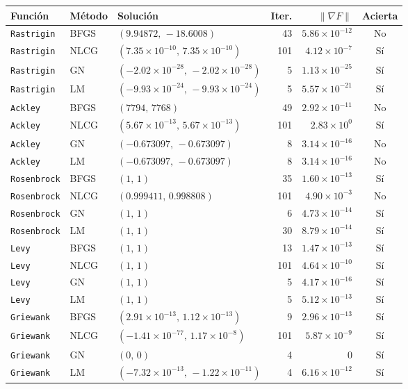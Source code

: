 \begin{tabular}{l l l r r c}
\toprule
\rowcolor{Azul1!50}
Función & Método & Solución & Iter. & $\|\nabla F\|$ & Acierta \\
\midrule
\texttt{Rastrigin} & BFGS & $(9.94872,\,-18.6008)$ & 43 & $5.86\times10^{-12}$ & No \\
\texttt{Rastrigin} & NLCG & $(7.35\times10^{-10},\,7.35\times10^{-10})$ & 101 & $4.12\times10^{-7}$ & Sí \\
\texttt{Rastrigin} & GN & $(-2.02\times10^{-28},\,-2.02\times10^{-28})$ & 5 & $1.13\times10^{-25}$ & Sí \\
\texttt{Rastrigin} & LM & $(-9.93\times10^{-24},\,-9.93\times10^{-24})$ & 5 & $5.57\times10^{-21}$ & Sí \\
\texttt{Ackley} & BFGS & $(7794,\,7768)$ & 49 & $2.92\times10^{-11}$ & No \\
\texttt{Ackley} & NLCG & $(5.67\times10^{-13},\,5.67\times10^{-13})$ & 101 & $2.83\times10^{0}$ & Sí \\
\texttt{Ackley} & GN & $(-0.673097,\,-0.673097)$ & 8 & $3.14\times10^{-16}$ & No \\
\texttt{Ackley} & LM & $(-0.673097,\,-0.673097)$ & 8 & $3.14\times10^{-16}$ & No \\
\texttt{Rosenbrock} & BFGS & $(1,\,1)$ & 35 & $1.60\times10^{-13}$ & Sí \\
\texttt{Rosenbrock} & NLCG & $(0.999411,\,0.998808)$ & 101 & $4.90\times10^{-3}$ & No \\
\texttt{Rosenbrock} & GN & $(1,\,1)$ & 6 & $4.73\times10^{-14}$ & Sí \\
\texttt{Rosenbrock} & LM & $(1,\,1)$ & 30 & $8.79\times10^{-14}$ & Sí \\
\texttt{Levy} & BFGS & $(1,\,1)$ & 13 & $1.47\times10^{-13}$ & Sí \\
\texttt{Levy} & NLCG & $(1,\,1)$ & 101 & $4.64\times10^{-10}$ & Sí \\
\texttt{Levy} & GN & $(1,\,1)$ & 5 & $4.17\times10^{-16}$ & Sí \\
\texttt{Levy} & LM & $(1,\,1)$ & 5 & $5.12\times10^{-13}$ & Sí \\
\texttt{Griewank} & BFGS & $(2.91\times10^{-13},\,1.12\times10^{-13})$ & 9 & $2.96\times10^{-13}$ & Sí \\
\texttt{Griewank} & NLCG & $(-1.41\times10^{-77},\,1.17\times10^{-8})$ & 101 & $5.87\times10^{-9}$ & Sí \\
\texttt{Griewank} & GN & $(0,\,0)$ & 4 & $0$ & Sí \\
\texttt{Griewank} & LM & $(-7.32\times10^{-13},\,-1.22\times10^{-11})$ & 4 & $6.16\times10^{-12}$ & Sí \\

\end{tabular}
